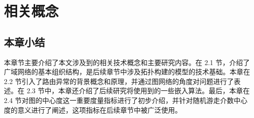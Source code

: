 \chapter{相关概念}










\section{本章小结}

本章节主要介绍了本文涉及到的相关技术概念和主要研究内容。在 2.1 节，介绍了广域网络的基本组织结构，是后续章节中涉及拓扑构建的模型的技术基础。本章在 2.2 节引入了路由异常的背景概念和原理，并通过图网络的角度对问题进行了表述。在 2.3 节中，本章还介绍了后续研究将使用到的一些嵌入算法。最后，本章在 2.4 节对图的中心度这一重要度量指标进行了初步介绍，并针对随机游走介数中心度的意义进行了阐述，这项指标在后续章节中被广泛使用。